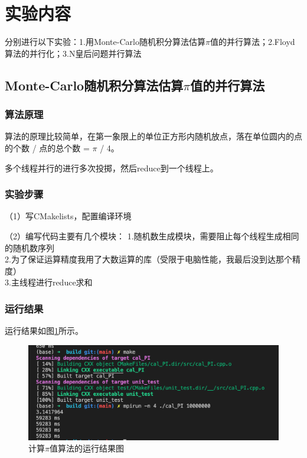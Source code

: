 \documentclass[10pt]{article}
\begin{document}
\section{实验内容}
分别进行以下实验：1.用Monte-Carlo随机积分算法估算$\pi$值的并行算法；2.Floyd算法的并行化；3.N皇后问题并行算法

\subsection{Monte-Carlo随机积分算法估算$\pi$值的并行算法}

\subsubsection{算法原理}

算法的原理比较简单，在第一象限上的单位正方形内随机放点，落在单位圆内的点的个数 / 点的总个数 = $\pi$ / 4。

多个线程并行的进行多次投掷，然后reduce到一个线程上。

\subsubsection{实验步骤}
（1）写CMakelists，配置编译环境

（2）编写代码主要有几个模块：
\quad 1.随机数生成模块，需要阻止每个线程生成相同的随机数序列 \\
\quad 2.为了保证运算精度我用了大数运算的库（受限于电脑性能，我最后没到达那个精度） \\
\quad 3.主线程进行reduce求和 \\


\subsubsection{运行结果}

运行结果如图\ref{pi结果图}所示。

\begin{figure}[htbp]
    \centering
    \includegraphics[width=.6\textwidth]{assets/cal_PI.png}
    \caption{计算$\pi$值算法的运行结果图}
    \label{pi结果图}
\end{figure}
\end{document}
